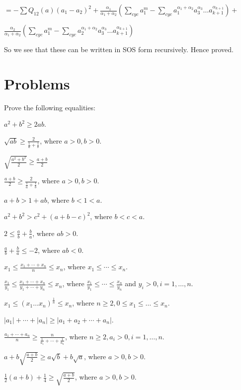   $= -\sum Q_{12}(a)(a_1 - a_2)^2 + \frac{\alpha_1}{\alpha_1 + \alpha_2}\left(\sum_{cyc} a_1^m - \sum_{cyc}a_1^{\alpha_1 +
    \alpha_2}a_3^{\alpha_3}\ldots a_{k+1}^{\alpha_{k+1}}\right) + $

  $\frac{\alpha_2}{\alpha_1 + \alpha_2}\left(\sum_{cyc} a_1^m - \sum_{cyc}a_2^{\alpha_1 + \alpha_2}a_3^{\alpha_3}\ldots a_{k+1}^{\alpha_{k+1}}\right)$

  So we see that these can be written in SOS form recursively. Hence proved.
\stopproof

\section{Problems}
Prove the following equalities:

\startitemize[n, 1*broad]
\item $a^2 + b^2 \geq 2ab$.
\item $\sqrt{ab}\geq \frac{2}{\frac{1}{a} + \frac{1}{b}}$, where $a>0, b>0$.
\item $\sqrt{\frac{a^2 + b^2}{2}}\geq \frac{a + b}{2}$
\item $\frac{a + b}{2}\geq \frac{2}{\frac{1}{a} + \frac{1}{b}}$, where $a>0, b>0$.
\item $a + b > 1 + ab$, where $b < 1 < a$.
\item $a^2 + b^2 > c^2 + (a + b - c)^2$, where $b < c< a$.
\item $2\leq \frac{a}{b} + \frac{b}{a}$, where $ab > 0$.
\item $\frac{a}{b} + \frac{b}{a}\leq -2$, where $ab < 0$.
\item $x_1\leq \frac{x_1 + \cdots + x_n}{n}\leq x_n$, where $x_1\leq \cdots\leq x_n$.
\item $\frac{x_1}{y_1}\leq \frac{x_1 + \cdots + x_n}{y_1 + \cdots + y_n}\leq x_n$, where $\frac{x_1}{y_1}\leq\cdots\leq
  \frac{x_n}{y_n}$ and $y_i> 0, i=1, \ldots, n$.
\item $x_1\leq(x_1\ldots x_n)^{\tfrac{1}{n}}\leq x_n$, where $n\geq 2, 0\leq x_1\leq\ldots\leq x_n$.
\item $|a_1| + \cdots + |a_n|\geq |a_1 + a_2 + \cdots + a_n|$.
\item $\frac{a_1 + \cdots + a_n}{n}\geq \frac{n}{\frac{1}{a_1} + \cdots + \frac{1}{a_n}}$, where $n\geq 2, a_i> 0, i=1, \ldots, n$.
\item $a + b\sqrt{\frac{a + b}{2}} \geq a\sqrt{b} + b\sqrt{a}$, where $a > 0, b > 0$.
\item $\frac{1}{2}(a + b) + \frac{1}{4}\geq \sqrt{\frac{a + b}{2}}$, where $a > 0, b > 0$.
